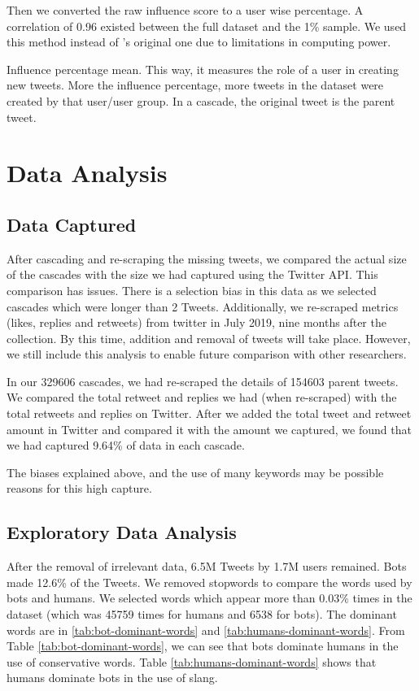 \documentclass[letterpaper]{article}
\begin{document}
Then we converted the raw influence score to a user wise percentage. A correlation of 0.96 existed between the full dataset and the 1\% sample. We used this method 
 instead of \cite{rizoiu2018debatenight}'s original one due to limitations in computing power.

 Influence percentage mean. This way, it measures the role of a user in creating new tweets. More the influence percentage, more tweets in the dataset were created by that user/user group. In 
a cascade, the original tweet is the parent tweet.


 \section{Data Analysis}
\label{sec:analysis}
\subsection{Data Captured}
After cascading and re-scraping the missing tweets, we compared the actual size of the cascades with the size we had captured using the Twitter API. This comparison has issues. 
There is a selection bias in this data as we selected cascades which were longer than 2 Tweets. Additionally, we re-scraped metrics (likes, replies and retweets) from twitter in July 2019, nine months after
 the collection. By this time, addition and removal of tweets will take place. However, we still include this analysis to enable future comparison with other researchers. \par

In our 329606 cascades, we had re-scraped the details of 154603 parent
tweets. We compared the total retweet and replies we had (when re-scraped) with the total retweets and replies on Twitter. After we added the total tweet and retweet amount in Twitter  
and compared it with the amount we captured, we found that we had captured 9.64\% of data in each cascade. \par

The biases explained
above, and the use of many keywords may be possible reasons for this high capture.

\subsection{Exploratory Data Analysis}
After the removal of irrelevant data, 6.5M Tweets by 1.7M users remained. Bots made 12.6\% of the Tweets. We removed stopwords to compare the words used by bots and humans. 
We selected words which appear more than 0.03\% times in the dataset (which was 45759 times for humans and 6538 for bots). The dominant words are in 
\ref{tab:bot-dominant-words} and  \ref{tab:humans-dominant-words}. From Table \ref{tab:bot-dominant-words}, we can see that bots dominate humans in the use of conservative words. 
Table \ref{tab:humans-dominant-words} shows that humans dominate bots in the use of slang. \par
\end{document}
